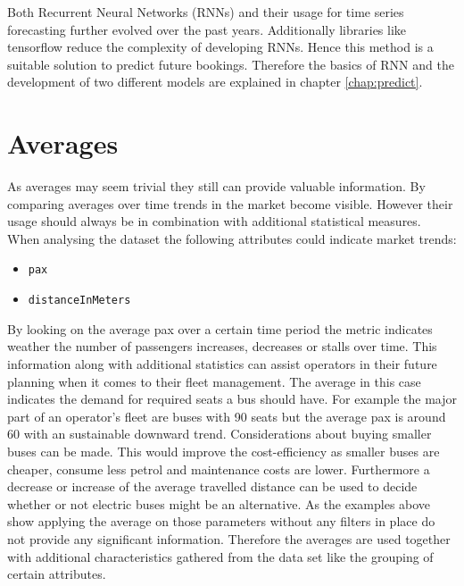 Both Recurrent Neural Networks (RNNs) and their usage for time series forecasting further evolved over the past years. Additionally libraries like tensorflow  reduce the complexity of developing RNNs.\cite{rnn_time_series_predict} Hence this method is a suitable solution to predict future bookings. Therefore the basics of RNN and the development of two different models are explained in chapter \ref{chap:predict}.

\section{Averages}
\label{sec:averages}
As averages may seem trivial they still can provide valuable information. By comparing averages over time trends in the market become visible. However their usage should always be in combination with additional statistical measures. When analysing the dataset the following attributes could indicate market trends: 
\begin{itemize}
\item \verb|pax|
\item \verb|distanceInMeters|
\end{itemize}
By looking on the average pax over a certain time period the metric indicates weather the number of passengers increases, decreases or stalls over time. This information along with additional statistics can assist operators in their future planning when it comes to their fleet management. The average in this case indicates the demand for required seats a bus should have. For example the major part of an operator's fleet are buses with 90 seats but the average pax is around 60 with an sustainable downward trend. Considerations about buying smaller buses can be made. This would improve the cost-efficiency as smaller buses are cheaper, consume less petrol and maintenance costs are lower. 
\newline 
Furthermore a decrease or increase of the average travelled distance can be used to decide whether or not electric buses might be an alternative.
\newline
As the examples above show applying the average on those parameters without any filters in place do not provide any significant information. Therefore the averages are used together with additional characteristics gathered from the data set like the grouping of certain attributes. 

